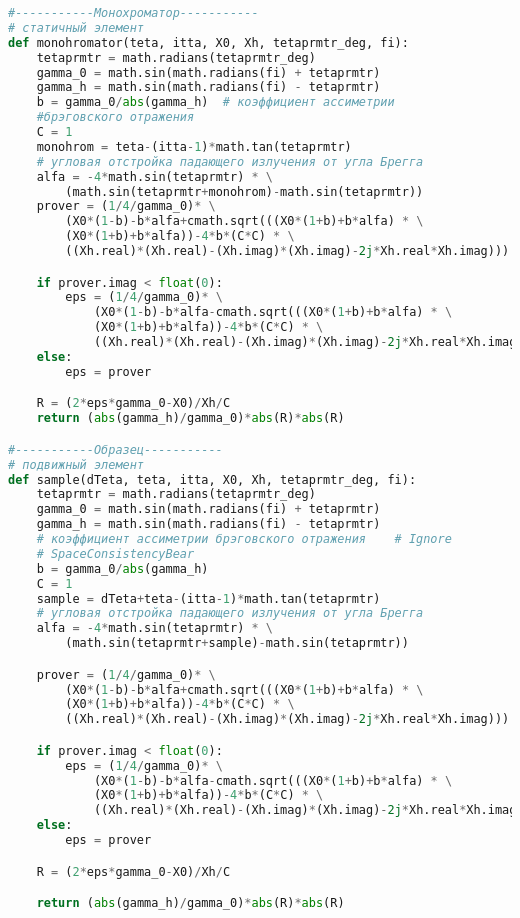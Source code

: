 
\newpage
  \begin{center}
  \section{ }%
  \label{sec:sample_functions}
  \end{center}
{\scriptsize
\begin{lstlisting}[language=Python]

#-----------Монохроматор-----------
# статичный элемент
def monohromator(teta, itta, X0, Xh, tetaprmtr_deg, fi):
    tetaprmtr = math.radians(tetaprmtr_deg)
    gamma_0 = math.sin(math.radians(fi) + tetaprmtr)
    gamma_h = math.sin(math.radians(fi) - tetaprmtr)
    b = gamma_0/abs(gamma_h)  # коэффициент ассиметрии
    #брэговского отражения
    C = 1
    monohrom = teta-(itta-1)*math.tan(tetaprmtr)
    # угловая отстройка падающего излучения от угла Брегга
    alfa = -4*math.sin(tetaprmtr) * \
        (math.sin(tetaprmtr+monohrom)-math.sin(tetaprmtr))
    prover = (1/4/gamma_0)* \
        (X0*(1-b)-b*alfa+cmath.sqrt(((X0*(1+b)+b*alfa) * \
        (X0*(1+b)+b*alfa))-4*b*(C*C) * \
        ((Xh.real)*(Xh.real)-(Xh.imag)*(Xh.imag)-2j*Xh.real*Xh.imag)))

    if prover.imag < float(0):
        eps = (1/4/gamma_0)* \
            (X0*(1-b)-b*alfa-cmath.sqrt(((X0*(1+b)+b*alfa) * \
            (X0*(1+b)+b*alfa))-4*b*(C*C) * \
            ((Xh.real)*(Xh.real)-(Xh.imag)*(Xh.imag)-2j*Xh.real*Xh.imag)))
    else:
        eps = prover

    R = (2*eps*gamma_0-X0)/Xh/C
    return (abs(gamma_h)/gamma_0)*abs(R)*abs(R)

#-----------Образец-----------
# подвижный элемент
def sample(dTeta, teta, itta, X0, Xh, tetaprmtr_deg, fi):
    tetaprmtr = math.radians(tetaprmtr_deg)
    gamma_0 = math.sin(math.radians(fi) + tetaprmtr)
    gamma_h = math.sin(math.radians(fi) - tetaprmtr)
    # коэффициент ассиметрии брэговского отражения    # Ignore
    # SpaceConsistencyBear
    b = gamma_0/abs(gamma_h)
    C = 1
    sample = dTeta+teta-(itta-1)*math.tan(tetaprmtr)
    # угловая отстройка падающего излучения от угла Брегга
    alfa = -4*math.sin(tetaprmtr) * \
        (math.sin(tetaprmtr+sample)-math.sin(tetaprmtr))

    prover = (1/4/gamma_0)* \
        (X0*(1-b)-b*alfa+cmath.sqrt(((X0*(1+b)+b*alfa) * \
        (X0*(1+b)+b*alfa))-4*b*(C*C) * \
        ((Xh.real)*(Xh.real)-(Xh.imag)*(Xh.imag)-2j*Xh.real*Xh.imag)))

    if prover.imag < float(0):
        eps = (1/4/gamma_0)* \
            (X0*(1-b)-b*alfa-cmath.sqrt(((X0*(1+b)+b*alfa) * \
            (X0*(1+b)+b*alfa))-4*b*(C*C) * \
            ((Xh.real)*(Xh.real)-(Xh.imag)*(Xh.imag)-2j*Xh.real*Xh.imag)))
    else:
        eps = prover

    R = (2*eps*gamma_0-X0)/Xh/C

    return (abs(gamma_h)/gamma_0)*abs(R)*abs(R)


\end{lstlisting}
}

